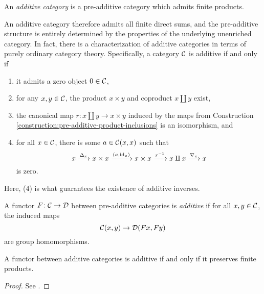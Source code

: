 \begin{definition}
	An \emph{additive category} is a pre-additive category which admits finite products.
\end{definition}
\begin{remark}\label{remark:additive-internal-characterization}
	An additive category therefore admits all finite direct sums, and the pre-additive structure is entirely determined by the properties of the underlying unenriched category. In fact,
	there is a characterization of additive categories in terms of purely ordinary category theory. Specifically, a category \(\mathcal{C}\) is additive if and only if
	\begin{enumerate}[label=(\arabic*)]
	\item it admits a zero object \(0\in\mathcal{C}\),
	\item for any \(x,y\in\mathcal{C}\), the product \(x\times y\) and coproduct \(x\amalg y\) exist,
	\item the canonical map \(r\!:x\amalg y \to x\times y\) induced by the maps from Construction \ref{construction:pre-additive-product-inclusions} is an isomorphism, and
	\item for all \(x\in\mathcal{C}\), there is some \(a\in\mathcal{C}(x,x)\) such that
	\[ x\xrightarrow{\Delta_x} x\times x\xrightarrow{(a,\mathrm{id}_x)}x\times x\xrightarrow{r^{-1}} x\amalg x\xrightarrow{\nabla_x} x \]
	is zero.
	\end{enumerate}
	Here, (4) is what guarantees the existence of additive inverses.
\end{remark}

\begin{definition}
	A functor \(F\!:\mathcal{C}\to\mathcal{D}\) between pre-additive categories is \emph{additive} if for all \(x,y\in\mathcal{C}\), the induced maps
	\[ \mathcal{C}(x,y)\to\mathcal{D}(Fx,Fy) \]
	are group homomorphisms.
\end{definition}
\begin{proposition}
	A functor between additive categories is additive if and only if it preserves finite products.
\end{proposition}
\begin{proof}
See \cite[Prop.\ 8.2.15]{kashiwara-schapira-book}.
\end{proof}

